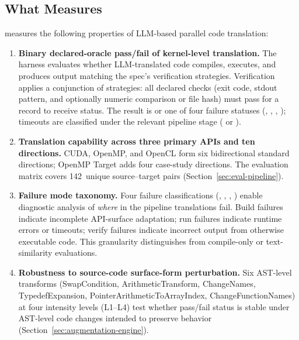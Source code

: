 \subsection{What \parbench{} Measures}
\label{sec:ec-measures}

\parbench{} measures the following properties of LLM-based parallel code
translation:
\begin{enumerate}
\item \textbf{Binary declared-oracle pass/fail of kernel-level translation.} 
    The harness evaluates whether LLM-translated code compiles, executes, and 
    produces output matching the spec's verification strategies. Verification 
    applies a conjunction of strategies: all declared checks (exit code, stdout 
    pattern, and optionally numeric comparison or file hash) must pass for a 
    record to receive \pass{} status. The result is \pass{} or one of four 
    failure statuses (\extractionfail{}, \buildfail{}, \runfail{}, 
    \verifyfail{}); timeouts are classified under the relevant pipeline stage 
    (\buildfail{} or \runfail{}).

  \item \textbf{Translation capability across three primary APIs and ten 
    directions.} CUDA, OpenMP, and OpenCL form six bidirectional standard 
    directions; OpenMP Target adds four case-study directions. The evaluation 
    matrix covers 142~unique source--target pairs 
    (Section~\ref{sec:eval-pipeline}).

  \item \textbf{Failure mode taxonomy.} Four failure classifications 
    (\extractionfail{}, \buildfail{}, \runfail{}, \verifyfail{}) enable 
    diagnostic analysis of \emph{where} in the pipeline translations fail. 
    Build failures indicate incomplete API-surface adaptation; run failures 
    indicate runtime errors or timeouts; verify failures indicate incorrect 
    output from otherwise executable code. This granularity distinguishes 
    \parbench{} from compile-only or text-similarity evaluations.

  \item \textbf{Robustness to source-code surface-form perturbation.} Six 
    AST-level transforms (SwapCondition, ArithmeticTransform, ChangeNames, 
    TypedefExpansion, PointerArithmeticToArrayIndex, ChangeFunctionNames) at 
    four intensity levels (L1--L4) test whether pass/fail status is stable 
    under AST-level code changes intended to preserve behavior 
    (Section~\ref{sec:augmentation-engine}).


\end{enumerate}
